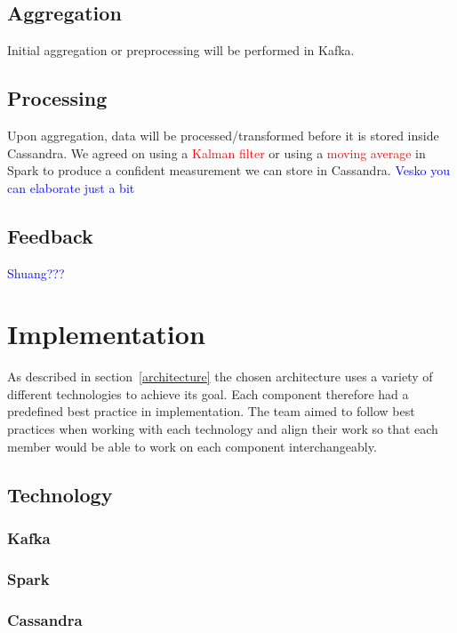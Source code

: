 \documentclass[prodmode,acmtosem]{acmsmall} %
\begin{document}
\subsection{Aggregation} 
Initial aggregation or preprocessing will be performed in Kafka.

\subsection{Processing}
Upon aggregation, data will be processed/transformed before it is stored inside Cassandra. We agreed on using a \textcolor{red}{Kalman filter} or using a \textcolor{red}{moving average} in Spark to produce a confident measurement we can store in Cassandra. \textcolor{blue}{Vesko you can elaborate just a bit}

\subsection{Feedback}
\textcolor{blue}{Shuang???}


\section{Implementation}
As described in section~\ref{architecture} the chosen architecture uses a variety of different technologies to achieve its goal. Each component therefore had a predefined best practice in implementation. The team aimed to follow best practices when working with each technology and align their work so that each member would be able to work on each component interchangeably.

\subsection{Technology}

\subsubsection{Kafka}
\subsubsection{Spark}
\subsubsection{Cassandra}
\end{document}
